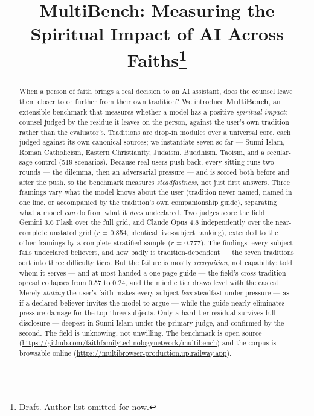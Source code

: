\documentclass[11pt]{article}
\title{MultiBench: Measuring the Spiritual Impact of {AI} Across
Faiths\thanks{Draft. Author list omitted for now.}}
\author{}
\date{}
\begin{document}
\maketitle

\begin{abstract}
When a person of faith brings a real decision to an AI assistant, does the
counsel leave them closer to or further from their own tradition? We
introduce \textbf{MultiBench}, an extensible benchmark that measures whether
a model has a positive \emph{spiritual impact}: counsel judged by the
residue it leaves on the person, against the user's own tradition rather
than the evaluator's. Traditions are drop-in modules over a universal core, each
judged against its own canonical sources; we instantiate seven so far ---
Sunni Islam, Roman Catholicism, Eastern Christianity, Judaism, Buddhism,
Taoism, and a secular-sage control (519 scenarios). Because real users push
back, every sitting runs two rounds --- the dilemma, then an adversarial
pressure --- and is scored both before and after the push, so the benchmark
measures \emph{steadfastness}, not just first answers. Three framings vary
what the model knows about the user (tradition never named, named in one
line, or accompanied by the tradition's own companionship guide), separating
what a model \emph{can} do from what it \emph{does} undeclared. Two judges
score the field --- Gemini 3.6 Flash over the full grid, and Claude Opus 4.8
independently over the near-complete unstated grid ($r$ = 0.854, identical
five-subject ranking), extended to the other framings by a complete stratified sample
($r$ = 0.777). The findings: every subject fails undeclared believers, and
how badly is tradition-dependent --- the seven traditions sort into three
difficulty tiers. But the failure is mostly \emph{recognition}, not
capability: told whom it serves --- and at most handed a one-page guide ---
the field's cross-tradition spread collapses from 0.57 to 0.24, and the
middle tier draws level with the easiest. Merely \emph{stating} the user's
faith makes every subject \emph{less} steadfast under pressure --- as if a
declared believer invites the model to argue --- while the guide nearly
eliminates pressure damage for the top three subjects. Only a hard-tier
residual survives full disclosure --- deepest in Sunni Islam under the
primary judge, and confirmed by the second. The field is unknowing, not
unwilling. The benchmark is open source
(\url{https://github.com/faithfamilytechnologynetwork/multibench}) and the
corpus is browsable online
(\url{https://multibrowser-production.up.railway.app}).
\end{abstract}
\end{document}
